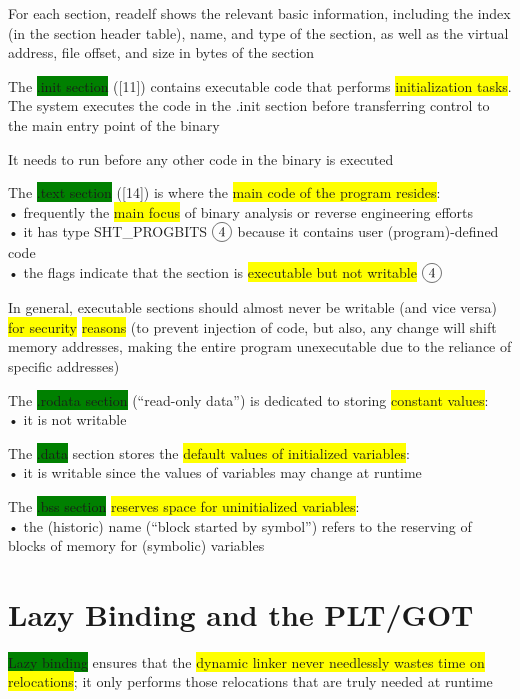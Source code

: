 \documentclass[]{project_plan}
\newcommand*\circled[1]{\tikz[baseline=(char.base)]{
            \node[shape=circle,draw,inner sep=2pt] (char) {#1};}}
\begin{document}
For each section, readelf shows the relevant basic information, including the
index (in the section header table), name, and type of the section,
as well as the virtual address, file offset, and size in bytes of the section

The \colorbox{green}{.init section} ([11]) contains executable code that performs \colorbox{yellow}{initialization
  tasks}. The system executes the code in the .init section before transferring
control to the main entry point of the binary

It needs to run before any other code in the binary is executed

The \colorbox{green}{.text section} ([14]) is where the \colorbox{yellow}{main code of the program resides}:\\
• frequently the \colorbox{yellow}{main focus} of binary analysis or reverse engineering efforts\\
• it has type SHT\_PROGBITS $\circled{4}$ because it contains user (program)-defined code\\
• the flags indicate that the section is \colorbox{yellow}{executable but not writable} $\circled{4}$

In general, executable sections should almost never be writable (and vice versa)
\colorbox{yellow}{for security} \colorbox{yellow}{reasons} (to prevent injection of code, but also, any change will
shift memory addresses, making the entire program unexecutable due to the reliance
of specific addresses)

The \colorbox{green}{.rodata section} (“read-only data”) is dedicated to storing \colorbox{yellow}{constant values}:\\
• it is not writable

The \colorbox{green}{.data} section stores the \colorbox{yellow}{default values of initialized variables}:\\
• it is writable since the values of variables may change at runtime

The \colorbox{green}{.bss section} \colorbox{yellow}{reserves space for uninitialized variables}:\\
• the (historic) name (“block started by symbol”) refers to the reserving of blocks of memory for (symbolic)
variables

\section{Lazy Binding and the PLT/GOT}

\colorbox{green}{Lazy binding} ensures that the \colorbox{yellow}{dynamic linker never needlessly wastes time on
  relocations}; it only performs those relocations that are truly needed at runtime
\end{document}
